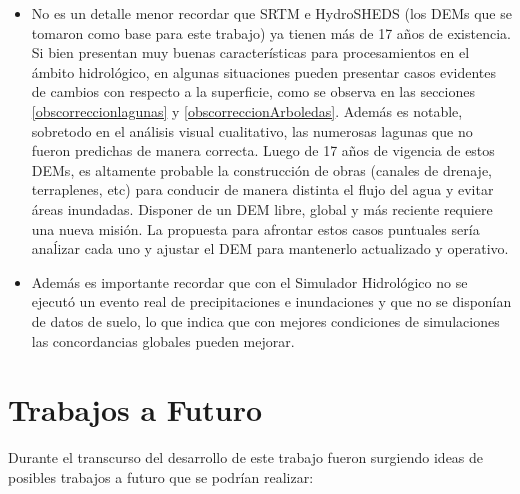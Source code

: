 \documentclass[10pt,a4paper, twoside]{report}
\begin{document}
\begin{itemize}
		\item No es un detalle menor recordar que SRTM e HydroSHEDS (los DEMs que se tomaron como base para este trabajo) ya tienen más de 17 años de existencia. Si bien presentan muy buenas características para procesamientos en el ámbito hidrológico, en algunas situaciones pueden presentar casos evidentes de cambios con respecto a la superficie, como se observa en las secciones \ref{obscorreccionlagunas} y \ref{obscorreccionArboledas}. Además es notable, sobretodo en el análisis visual cualitativo, las numerosas lagunas que no fueron predichas de manera correcta. Luego de 17 años de vigencia de estos DEMs, es altamente probable la construcción de obras (canales de drenaje, terraplenes, etc) para conducir de manera distinta el flujo del agua y evitar áreas inundadas. Disponer de un DEM libre, global y más reciente requiere una nueva misión. La propuesta para afrontar estos casos puntuales sería anaĺizar cada uno y ajustar el DEM para mantenerlo actualizado y operativo.
		\item Además es importante recordar que con el Simulador Hidrológico no se ejecutó un evento real de precipitaciones e inundaciones y que no se disponían de datos de suelo, lo que indica que con mejores condiciones de simulaciones las concordancias globales pueden mejorar.
		
		
\end{itemize}

\section{Trabajos a Futuro}

Durante el transcurso del desarrollo de este trabajo fueron surgiendo ideas de posibles trabajos a futuro que se podrían realizar:
\end{document}
